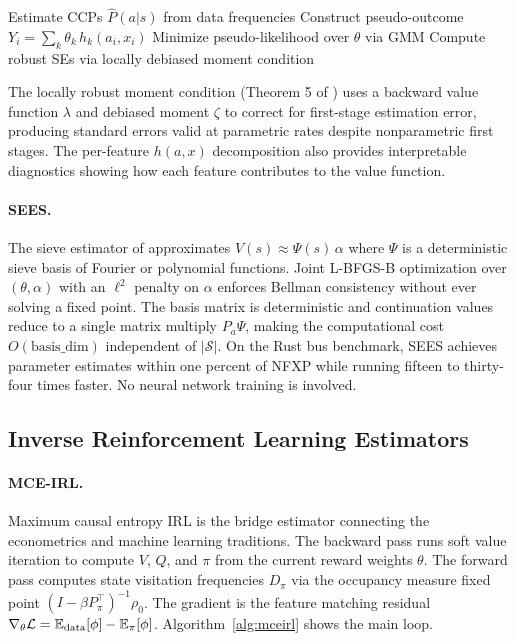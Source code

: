 \begin{algorithm}[H]
\DontPrintSemicolon
\caption{TD-CCP, linear semi-gradient \citep{adusumilliEckardt2025}}
\label{alg:tdccp}
Estimate CCPs $\hat P(a|s)$ from data frequencies\;
Construct pseudo-outcome $Y_i = \sum_k \theta_k\, h_k(a_i, x_i)$\;
Minimize pseudo-likelihood over $\theta$ via GMM\;
Compute robust SEs via locally debiased moment condition\;
\end{algorithm}

The locally robust moment condition (Theorem 5 of \citealt{adusumilliEckardt2025}) uses a backward value function $\lambda$ and debiased moment $\zeta$ to correct for first-stage estimation error, producing standard errors valid at parametric rates despite nonparametric first stages.
The per-feature $h(a,x)$ decomposition also provides interpretable diagnostics showing how each feature contributes to the value function.

\paragraph{SEES.}
The sieve estimator of \citet{luoSang2024} approximates $V(s) \approx \Psi(s)\,\alpha$ where $\Psi$ is a deterministic sieve basis of Fourier or polynomial functions.
Joint L-BFGS-B optimization over $(\theta, \alpha)$ with an $\ell^2$ penalty on $\alpha$ enforces Bellman consistency without ever solving a fixed point.
The basis matrix is deterministic and continuation values reduce to a single matrix multiply $P_a \Psi$, making the computational cost $O(\text{basis\_dim})$ independent of $|\mathcal{S}|$.
On the Rust bus benchmark, SEES achieves parameter estimates within one percent of NFXP while running fifteen to thirty-four times faster.
No neural network training is involved.


\subsection{Inverse Reinforcement Learning Estimators}

\paragraph{MCE-IRL.}
Maximum causal entropy IRL \citep{ziebart2010} is the bridge estimator connecting the econometrics and machine learning traditions.
The backward pass runs soft value iteration to compute $V$, $Q$, and $\pi$ from the current reward weights $\theta$.
The forward pass computes state visitation frequencies $D_\pi$ via the occupancy measure fixed point $(I - \beta P_\pi^\top)^{-1}\rho_0$.
The gradient is the feature matching residual $\nabla_\theta \mathcal{L} = \mathbb{E}_{\text{data}}[\phi] - \mathbb{E}_\pi[\phi]$.
Algorithm~\ref{alg:mceirl} shows the main loop.

